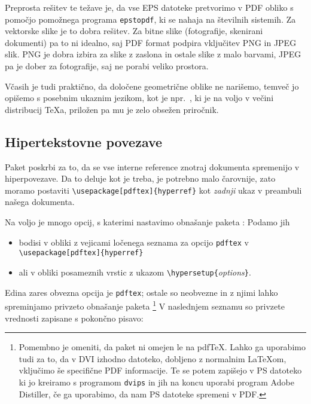 Preprosta rešitev te težave je, da vse EPS datoteke pretvorimo 
v PDF obliko s pomočjo pomožnega programa \texttt{epstopdf}, ki se
nahaja na številnih sistemih. 
Za vektorske slike je to dobra rešitev. Za bitne slike
(fotografije, skenirani dokumenti) pa to ni idealno, saj
PDF format podpira vključitev PNG in JPEG slik. PNG je
dobra izbira za slike z zaslona in ostale slike z malo barvami,
JPEG pa je dober za fotografije, saj ne porabi 
veliko prostora.

Včasih je tudi praktično, da določene geometrične oblike ne narišemo,
temveč jo opišemo s posebnim ukaznim jezikom, kot je 
npr.~\MP{}, ki je na voljo v večini
distribucij \TeX{}a, priložen pa mu je zelo obsežen priročnik.

\subsection{Hipertekstovne povezave}
\label{ssec:pdfhyperref}

Paket  poskrbi za to, da se vse interne reference znotraj
dokumenta spremenijo v hiperpovezave. Da to deluje kot je treba,
je potrebno malo čarovnije, zato moramo postaviti 
\verb+\usepackage[pdftex]{hyperref}+ kot \emph{zadnji} ukaz v 
preambuli našega dokumenta.

Na voljo je mnogo opcij, s katerimi nastavimo obnašanje
paketa :  Podamo jih
\begin{itemize}
\item bodisi v obliki z vejicami ločenega  seznama za opcijo
\texttt{pdftex} v \\
  \verb+\usepackage[pdftex]{hyperref}+
\item ali v obliki posameznih vrstic z ukazom
  \verb+\hypersetup{+\emph{options}\verb+}+.
\end{itemize}

Edina zares obvezna opcija je \texttt{pdftex}; ostale so 
neobvezne in z njimi lahko spreminjamo privzeto obnašanje paketa
\footnote{Pomembno je omeniti, da paket  
ni omejen le na pdf\TeX{}. Lahko ga uporabimo tudi za to, da v DVI izhodno datoteko, dobljeno z normalnim \LaTeX{}om, vključimo
še specifične PDF informacije. Te se potem zapišejo v PS datoteko ki jo kreiramo 
s programom \texttt{dvips} in jih na koncu uporabi program Adobe
Distiller, če ga uporabimo, da nam PS datoteke spremeni v PDF.} V naslednjem 
seznamu so privzete vrednosti zapisane s pokončno pisavo:

